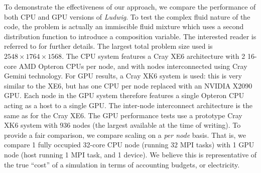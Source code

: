 
To demonstrate the effectiveness of our approach, we compare the
performance of both CPU and GPU versions of \textit{Ludwig}. To
test the complex fluid nature of the code, the problem is
actually an immiscible fluid mixture which uses a second distribution
function to introduce a composition variable. The interested reader
is referred to \cite{ch14:stratford-jsp2005} for further details. The
largest total problem size used is $2548\times 1764\times 1568$.
The CPU system features a Cray XE6 architecture with 2 16-core AMD Opteron
CPUs per node, and with nodes interconnected using Cray Gemini technology.
For GPU results, a Cray XK6 system is used: this is very similar to the
XE6, but has one CPU per node replaced with an NVIDIA X2090 GPU. Each
node in the GPU system therefore features a single Opteron CPU acting
as a host to a single GPU. The inter-node interconnect architecture is
the same as for the Cray XE6. The GPU performance tests use a prototype
Cray XK6 system with 936 nodes (the largest available at the time of writing).
To provide a fair comparison, we compare scaling on a \textit{per node}
basis. That is, we compare 1 fully occupied 32-core CPU node
(running 32 MPI tasks) with 1 GPU node (host running 1 MPI task,
and 1 device). We believe this is representative of the true ``cost'' of
a simulation in terms of accounting budgets, or electricity.



